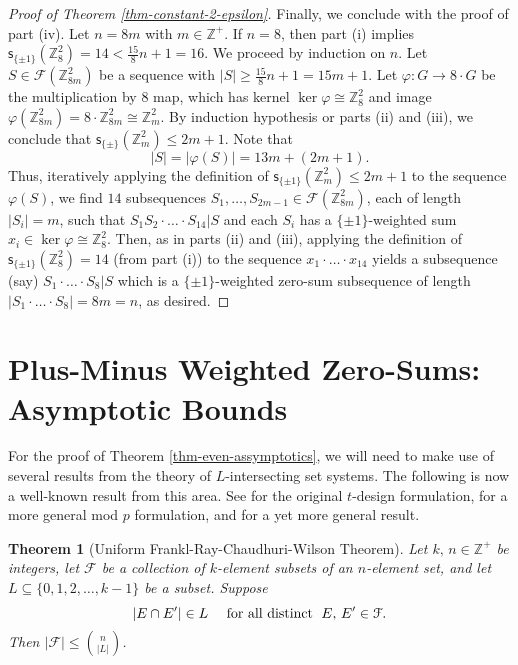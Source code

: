 \documentclass[11pt,reqno]{amsart}
\numberwithin{equation}{section}
\newtheorem{Theorem} {Theorem} [section]
\theoremstyle{definition}
\numberwithin{equation}{section}
\begin{document}
\begin{proof}[Proof of Theorem \ref{thm-constant-2-epsilon}]
\bigskip

Finally, we conclude with the proof of part (iv). Let $n=8m$ with
$m\in {\mathbb Z}^+$. If $n=8$, then part (i) implies $\mathsf s_{\{\pm
1\}}({\mathbb Z}^2_8)=14<\frac{15}{8}n+1=16$. We proceed by induction on $n$.
Let $S\in {\mathcal F}({\mathbb Z}_{8m}^2)$ be a sequence  with $|S|\geq
\frac{15}{8}n+1=15m+1$. Let $\varphi:G\rightarrow 8\cdot  G$ be the
multiplication by $8$ map, which has kernel $\ker \varphi\cong
{\mathbb Z}_{8}^2$ and image $\varphi({\mathbb Z}_{8m}^2)=8 \cdot {\mathbb Z}_{8m}^2\cong
{\mathbb Z}_m^2$. By induction hypothesis or parts (ii) and (iii), we
conclude that $\mathsf s_{\{\pm\}}({\mathbb Z}_m^2)\leq 2m+1$. Note that
$$|S|=|\varphi(S)|=13m+(2m+1).$$ Thus, iteratively applying the
 definition of $\mathsf s_{\{\pm 1\}}({\mathbb Z}_{m}^2)\leq 2m+1$ to the
 sequence $\varphi(S)$, we find $14$ subsequences
 $S_1,\ldots,S_{2m-1}\in {\mathcal F}({\mathbb Z}_{8m}^2)$, each of length $|S_i|=m$, such that
 $S_1S_2\cdot \ldots\cdot S_{14}|S$ and each $S_i$ has a $\{\pm
 1\}$-weighted sum $x_i\in \ker \varphi\cong {\mathbb Z}^2_8$. Then, as in
 parts (ii) and (iii), applying the definition of $\mathsf s_{\{\pm 1\}}({\mathbb Z}_8^2)=14$ (from part (i))
 to the sequence $x_1\cdot \ldots\cdot
 x_{14}$ yields a subsequence (say) $S_1\cdot \ldots\cdot S_8|S$ which
 is a $\{\pm 1\}$-weighted zero-sum subsequence of length
$|S_1\cdot\ldots\cdot S_8|=8m=n$, as desired.\qedsymbol
\end{proof}

\section{Plus-Minus Weighted Zero-Sums: Asymptotic Bounds}

For the proof of Theorem \ref{thm-even-assymptotics}, we will need
to make use of several results from the theory of $L$-intersecting
set systems. The following is now a well-known result from this
area. See \cite{Ray-chaudhur-Wilson} for the original $t$-design
formulation, \cite{Frannkl-Wilson} for a more general mod $p$
formulation, and \cite{ABS} for a yet more general result.

\begin{Theorem}[Uniform Frankl-Ray-Chaudhuri-Wilson Theorem]\label{Ray-Chaudhuri-Wilson-thm} Let $k,\,n\in {\mathbb Z}^+$
be integers,
let $\mathcal F$ be a collection of $k$-element subsets of an $n$-element set, and let $L\subseteq \{0,1,2,\ldots,k-1\}$
be a subset.
Suppose \begin{equation}{\nonumber} |E\cap E'|\in L\quad \mbox{ for all distinct }\; E,\,E'\in \mathcal F.\end{equation}
Then $|\mathcal F|\leq \binom{n}{|L|}$.
\end{Theorem}
\end{document}
